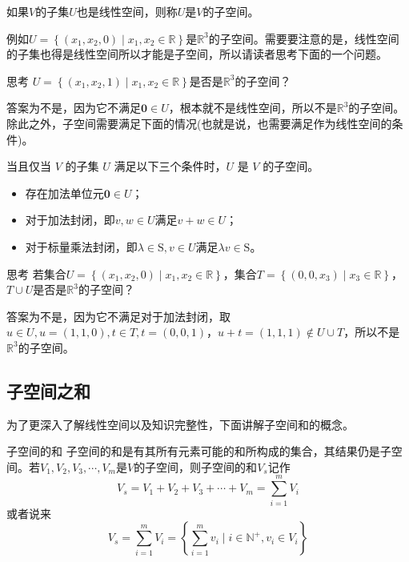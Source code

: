 \begin{definition}
	如果$V$的子集$U$也是线性空间，则称$U$是$V$的子空间。
\end{definition}

例如$U=\left\{ (x_1,x_2,0) \mid x_1,x_2 \in \mathbb{R} \right\}$是$\mathbb{R}^3$的子空间。需要要注意的是，线性空间的子集也得是线性空间所以才能是子空间，所以请读者思考下面的一个问题。

\begin{ascolorbox1}{思考}
	$U=\left\{ (x_1,x_2,1) \mid x_1,x_2 \in \mathbb{R} \right\}$是否是$\mathbb{R}^3$的子空间？
\end{ascolorbox1}

答案为不是，因为它不满足$\boldsymbol{0}\in U$，根本就不是线性空间，所以不是$\mathbb{R}^3$的子空间。除此之外，子空间需要满足下面的情况(也就是说，也需要满足作为线性空间的条件)。

\begin{corollary}
	当且仅当 $V$ 的子集 $U$ 满足以下三个条件时，$U$ 是 $V$ 的子空间。
	\begin{itemize}
		\item 存在加法单位元$\boldsymbol{0}\in U$；
		\item 对于加法封闭，即$v,w\in U$满足$v+w\in U$；
		\item 对于标量乘法封闭，即$\lambda \in \mathrm{S},v\in U$满足$\lambda v\in \mathrm{S}$。
	\end{itemize}
\end{corollary}

\begin{ascolorbox1}{思考}
	若集合$U=\left\{ (x_1,x_2,0) \mid x_1,x_2 \in \mathbb{R} \right\}$，集合$T=\left\{ (0,0,x_3) \mid x_3 \in \mathbb{R} \right\}$，$T\cup U$是否是$\mathbb{R}^3$的子空间？
\end{ascolorbox1}

答案为不是，因为它不满足对于加法封闭，取$u\in U,u=(1,1,0),t \in T,t=(0,0,1)$，$u+t=(1,1,1) \notin U\cup T$，所以不是$\mathbb{R}^3$的子空间。

\subsection{子空间之和}

为了更深入了解线性空间以及知识完整性，下面讲解子空间和的概念。

\begin{definition}{子空间的和}
	子空间的和是有其所有元素可能的和所构成的集合，其结果仍是子空间。若$V_1,V_2,V_3,\cdots,V_m$是$V$的子空间，则子空间的和$V_s$记作$$V_s=V_1+V_2+V_3+\cdots+V_m=\sum_{i=1}^{m}V_i $$或者说来$$V_s=\sum_{i=1}^{m}V_i =\left\{ \sum_{i=1}^{m}v_i \mid i\in \mathbb{N}^+,v_i \in V_i \right\}$$
\end{definition}

